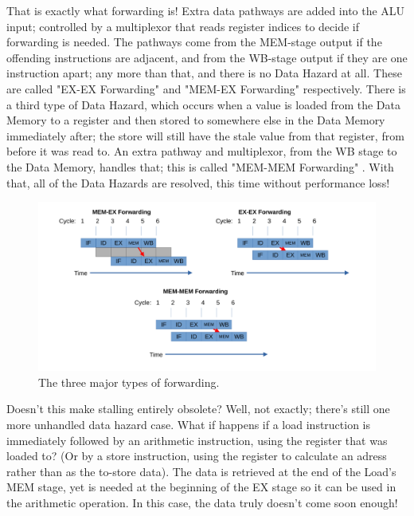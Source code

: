 \documentclass[12pt,twoside]{reedthesis}
\begin{document}
That is exactly what forwarding is! Extra data pathways are added  into the ALU input; controlled by a multiplexor that reads register indices to decide if forwarding is needed. The pathways come from the MEM-stage output if the offending instructions are adjacent, and from the WB-stage output if they are one instruction apart; any more than that, and there is no Data Hazard at all. These are called "EX-EX Forwarding" and "MEM-EX Forwarding" respectively. There is a third type of Data Hazard, which occurs when a value is loaded from the Data Memory to a register and then stored to somewhere else in the Data Memory immediately after; the store will still have the stale value from that register, from before it was read to. An extra pathway and multiplexor, from the WB stage to the Data Memory, handles that; this is called "MEM-MEM Forwarding" . With that, all of the Data Hazards are resolved, this time without performance loss!

\begin{figure}[h!]

	\centering
	\includegraphics[scale=0.46]{forwards}
	\caption{The three major types of forwarding.}
	\label{fwd-types}
\end{figure}

Doesn't this make stalling entirely obsolete? Well, not exactly; there's still one more unhandled data hazard case. What if happens if a load instruction is immediately followed by an arithmetic instruction, using the register that was loaded to? (Or by a store instruction, using the register to calculate an adress rather than as the to-store data). The data is retrieved at the end of the Load's MEM stage, yet is needed at the beginning of the EX stage so it can be used in the arithmetic operation. In this case, the data truly doesn't come soon enough!
\end{document}
